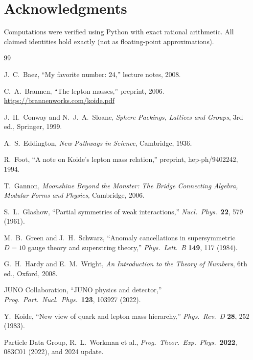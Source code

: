 \documentclass[11pt,letterpaper]{article}
\theoremstyle{definition}
\theoremstyle{remark}
\begin{document}
\section*{Acknowledgments}

Computations were verified using Python with exact rational arithmetic.  
All claimed identities hold exactly (not as floating-point approximations).

\begin{thebibliography}{99}

J.~C.~Baez, ``My favorite number: 24,'' lecture notes, 2008.

C.~A.~Brannen, ``The lepton masses,'' preprint, 2006.
\url{https://brannenworks.com/koide.pdf}

J.~H.~Conway and N.~J.~A.~Sloane,
\textit{Sphere Packings, Lattices and Groups},
3rd ed., Springer, 1999.

A.~S.~Eddington, \textit{New Pathways in Science}, Cambridge, 1936.

R.~Foot, ``A note on Koide's lepton mass relation,''
preprint, hep-ph/9402242, 1994.

T.~Gannon, \textit{Moonshine Beyond the Monster: The Bridge Connecting 
Algebra, Modular Forms and Physics}, Cambridge, 2006.

S.~L.~Glashow, ``Partial symmetries of weak interactions,''
\textit{Nucl.\ Phys.}\ \textbf{22}, 579 (1961).

M.~B.~Green and J.~H.~Schwarz, ``Anomaly cancellations in supersymmetric 
$D=10$ gauge theory and superstring theory,''
\textit{Phys.\ Lett.\ B} \textbf{149}, 117 (1984).

G.~H.~Hardy and E.~M.~Wright,
\textit{An Introduction to the Theory of Numbers},
6th ed., Oxford, 2008.

JUNO Collaboration, ``JUNO physics and detector,''
\textit{Prog.\ Part.\ Nucl.\ Phys.}\ \textbf{123}, 103927 (2022).

Y.~Koide, ``New view of quark and lepton mass hierarchy,''
\textit{Phys.\ Rev.\ D} \textbf{28}, 252 (1983).

Particle Data Group, R.~L.~Workman et al.,
\textit{Prog.\ Theor.\ Exp.\ Phys.}\ \textbf{2022}, 083C01 (2022),
and 2024 update.


\end{thebibliography}
\end{document}

